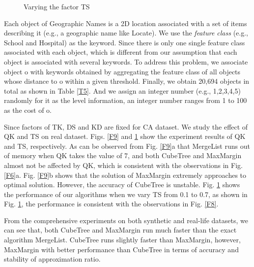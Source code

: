\begin{figure}[h] \centering
\caption{Varying the factor TS}
\label{F10}
\end{figure}

Each object of Geographic Names is a 2D location associated with a set of items describing it (e.g., a geographic name like Locate). We use the \textit{feature class} (e.g., School and Hospital) as the keyword. Since there is only one single feature class associated with each object, which is different from our assumption that each object is associated with several keywords. To address this problem, we associate object o with keywords obtained by aggregating the feature class of all objects whose distance to o within a given threshold. Finally, we obtain 20,694 objects in total as shown in Table \ref{T5}. And we assign an integer number (e.g., 1,2,3,4,5) randomly for it as the level information, an integer number ranges from 1 to 100 as the cost of o.

Since factors of TK, DS and KD are fixed for CA dataset. We study the effect of QK and TS on real dataset. Figs. \ref{F9} and \ref{F10} show the experiment results of QK and TS, respectively. As can be observed from Fig. \ref{F9}a that MergeList runs out of memory when QK takes the value of 7, and both CubeTree and MaxMargin almost not be affected by QK, which is consistent with the observations in Fig. \ref{F6}a. Fig. \ref{F9}b shows that the solution of MaxMargin extremely approaches to optimal solution. However, the accuracy of CubeTree is unstable. Fig. \ref{F10} shows the performance of our algorithms when we vary TS from 0.1 to 0.7, as shown in Fig. \ref{F10}, the performance is consistent with the observations in Fig. \ref{F8}.

From the comprehensive experiments on both synthetic and real-life datasets, we can see that, both CubeTree and MaxMargin run much faster than the exact algorithm MergeList. CubeTree runs slightly faster than MaxMargin, however, MaxMargin with better performance than CubeTree in terms of accuracy and stability of approximation ratio. 